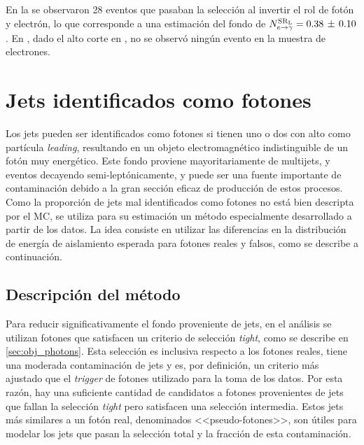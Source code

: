 En la {\SRL} se observaron 28 eventos que pasaban la selección al invertir el
rol de fotón y electrón, lo que corresponde a una estimación del fondo de
$N^{\mathrm{SR}_\mathrm{L}}_{e\rightarrow\gamma} = 0.38\, \pm\, 0.10$. En {\SRH}, dado el alto corte en
{\met}, no se observó ningún evento en la muestra de electrones.



\section{Jets identificados como fotones}
\label{sec:jfakes}

Los jets pueden ser identificados como fotones si tienen uno o dos {\pizero} con
alto {\pt} como partícula \emph{leading}, resultando en un objeto
electromagnético indistinguible de un fotón muy energético. Este fondo
proviene mayoritariamente de multijets, {\wjets} y eventos {\ttbar} decayendo
semi-leptónicamente, y puede ser una fuente importante de contaminación debido a
la gran sección eficaz de producción de estos procesos. Como la proporción de
jets mal identificados como fotones no está bien descripta por el MC, se
utiliza para su estimación un método especialmente desarrollado a partir de los datos.
La idea consiste en utilizar las diferencias en la distribución de energía de aislamiento
esperada para fotones reales y falsos, como se describe a continuación.

\subsection{Descripción del método}

Para reducir significativamente el fondo proveniente de jets, en el análisis se
utilizan fotones que satisfacen un criterio de selección \emph{tight}, como se
describe en \cref{sec:obj_photons}. Esta selección es inclusiva respecto a los
fotones reales, tiene una moderada contaminación de jets y es, por definición,
un criterio más ajustado que el \emph{trigger} de fotones utilizado para la toma de los
datos. Por esta razón, hay una suficiente cantidad de candidatos a fotones
provenientes de jets que fallan la selección \emph{tight} pero satisfacen una
selección intermedia. Estos jets más similares a un fotón real, denominados
<<pseudo-fotones>>, son útiles para modelar los jets que pasan la selección
total y la fracción de esta contaminación.


